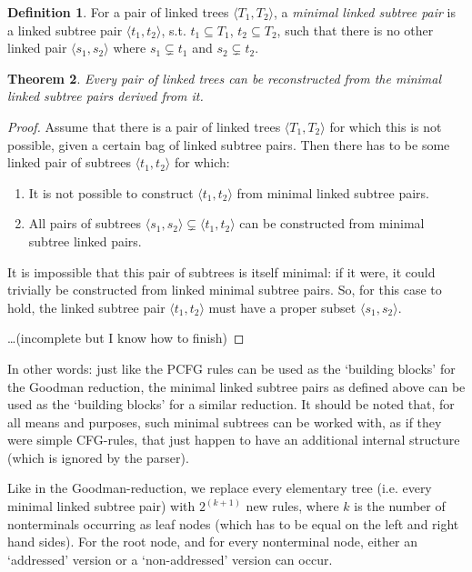 \documentclass[a4paper]{article}
\newtheorem{theorem}{Theorem}[section]
\theoremstyle{definition}
\newtheorem{definition}[theorem]{Definition}
\begin{document}
{{\begin{definition}
For a pair of linked trees $\langle T_1, T_2 \rangle$, a \emph{minimal linked
subtree pair} is a linked subtree pair $\langle t_1, t_2 \rangle$, s.t. $t_1
\subseteq T_1$, $t_2 \subseteq T_2$, such that there is no other linked pair
$\langle s_1, s_2 \rangle$ where $s_1 \subsetneq t_1$ and $s_2 \subsetneq t_2$.
\end{definition}

\begin{theorem}
Every pair of linked trees can be reconstructed from the minimal linked subtree
pairs derived from it.
\end{theorem}

\begin{proof}

Assume that there is a pair of linked trees $\langle T_1, T_2 \rangle$ for
which this is not possible, given a certain bag of linked subtree pairs. Then
there has to be some linked pair of subtrees $\langle t_1, t_2 \rangle$ for
which:

\begin{enumerate}
\item It is not possible to construct $\langle t_1, t_2 \rangle$ from minimal
	linked subtree pairs.
\item All pairs of subtrees $\langle s_1, s_2 \rangle \subsetneq \langle t_1,
	t_2 \rangle$ can be constructed from minimal subtree linked pairs.
\end{enumerate}

It is impossible that this pair of subtrees is itself minimal: if it were, it
could trivially be constructed from linked minimal subtree pairs. So, for this
case to hold, the linked subtree pair $\langle t_1, t_2 \rangle$ must have a
proper subset $\langle s_1, s_2 \rangle$.

\ldots (incomplete but I know how to finish)

\end{proof}

In other words: just like the PCFG rules can be used as the `building blocks'
for the Goodman reduction, the minimal linked subtree pairs as defined above
can be used as the `building blocks' for a similar reduction. It should be
noted that, for all means and purposes, such minimal subtrees can be worked
with, as if they were simple CFG-rules, that just happen to have an additional
internal structure (which is ignored by the parser).

Like in the Goodman-reduction, we replace every elementary tree (i.e. every
minimal linked subtree pair) with $2^{(k+1)}$ new rules, where $k$ is the
number of nonterminals occurring as leaf nodes (which has to be equal on the
left and right hand sides). For the root node, and for every nonterminal node,
either an `addressed' version or a `non-addressed' version can occur.

}}
\end{document}
